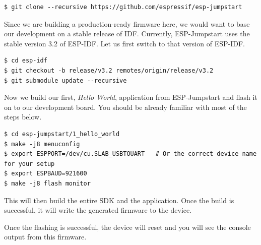 \documentclass[main.tex]{subfiles}
\begin{document}
\begin{verbatim}
$ git clone --recursive https://github.com/espressif/esp-jumpstart
\end{verbatim}

Since we are building a production-ready firmware here, we would want to base our development on a stable release of IDF. Currently, ESP-Jumpstart uses the stable version 3.2 of ESP-IDF. Let us first switch to that version of ESP-IDF.
\begin{verbatim}
$ cd esp-idf
$ git checkout -b release/v3.2 remotes/origin/release/v3.2
$ git submodule update --recursive
\end{verbatim}

Now we build our first, \textit{Hello World}, application from ESP-Jumpstart and flash it on to our development board. You should be already familiar with most of the steps below.

\begin{verbatim}
$ cd esp-jumpstart/1_hello_world
$ make -j8 menuconfig
$ export ESPPORT=/dev/cu.SLAB_USBTOUART   # Or the correct device name for your setup
$ export ESPBAUD=921600
$ make -j8 flash monitor
\end{verbatim}

This will then build the entire SDK and the application. Once the build is successful, it will write the generated firmware to the device.


Once the flashing is successful, the device will reset and you will see the console output from this firmware.
\end{document}
